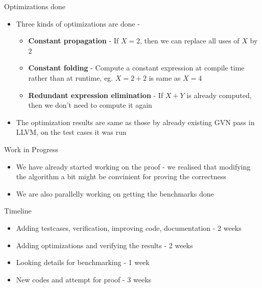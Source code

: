 \documentclass[11pt]{beamer}
\begin{document}
\begin{frame}{Optimizations done}
    \begin{itemize}
        \item Three kinds of optimizations are done -
        \begin{itemize}
            \item \textbf{Constant propagation} - If $X = 2$, then we can replace all uses of $X$ by $2$
            \item \textbf{Constant folding} - Compute a constant expression at compile time rather than at runtime, eg. $X = 2 + 2$ is same as $X = 4$
            \item \textbf{Redundant expression elimination} - If $X + Y$ is already computed, then we don't need to compute it again
        \end{itemize}
        \item The optimization results are same as those by already existing GVN pass in LLVM, on the test cases it was run
    \end{itemize}
\end{frame}

\begin{frame}{Work in Progress}
    \begin{itemize}
        \item We have already started working on the proof - we realised that modifying the algorithm a bit might be convinient for proving the correctness
        \item We are also parallelly working on getting the benchmarks done
    \end{itemize}
\end{frame}

\begin{frame}{Timeline}
    \begin{itemize}
        \item Adding testcases, verification, improving code, documentation - 2 weeks
        \item Adding optimizations and verifying the results - 2 weeks 
        \item Looking details for benchmarking - 1 week 
        \item New codes and attempt for proof - 3 weeks  
    \end{itemize}
\end{frame}
\end{document}
